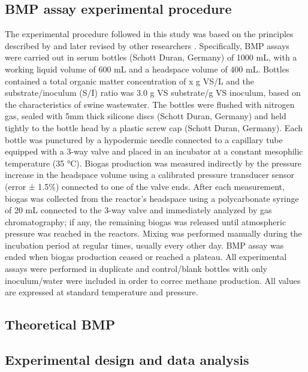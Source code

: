 \subsection{BMP assay experimental procedure}
The experimental procedure followed in this study was based on the principles described by \cite{Owen_1979} and later revised by other researchers \cite{Angelidaki_2009,Holliger_2016}. Specifically, BMP assays were carried out in serum bottles (Schott Duran, Germany) of 1000 mL, with a working liquid volume of 600 mL and a headspace volume of 400 mL. Bottles contained a total organic matter concentration of x g VS/L and the substrate/inoculum (S/I) ratio was 3.0 g VS substrate/g VS inoculum, based on the characteristics of swine wastewater. The bottles were flushed with nitrogen gas, sealed with 5mm thick silicone discs (Schott Duran, Germany) and held tightly to the bottle head by a plastic screw cap (Schott Duran, Germany). Each bottle was punctured by a hypodermic needle connected to a capillary tube equipped with a 3-way valve and placed in an incubator at a constant mesophilic temperature (35 °C). Biogas production was measured indirectly by the pressure increase in the headspace volume using a calibrated pressure transducer sensor (error ± 1.5\%) connected to one of the valve ends. After each measurement, biogas was collected from the reactor's headspace using a polycarbonate syringe of 20 mL connected to the 3-way valve and immediately analyzed by gas chromatography; if any, the remaining biogas was released until atmospheric pressure was reached in the reactors. Mixing was performed manually during the incubation period at regular times, usually every other day. BMP assay was ended when biogas production ceased or reached a plateau. All experimental assays were performed in duplicate and control/blank bottles with only inoculum/water were included in order to correc methane production.  All values are expressed at standard temperature and pressure.
\subsection{Theoretical BMP}

\subsection{Experimental design and data analysis}



